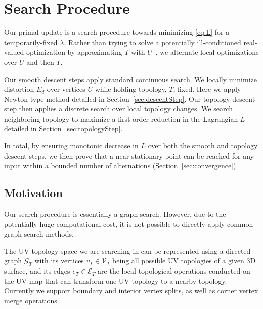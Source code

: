 
\section{Search Procedure}%
\label{sec:DCSearch}

Our primal update is a search procedure towards minimizing \eqref{eq:L} for a temporarily-fixed $\lambda$. 
Rather than trying to solve a potentially ill-conditioned real-valued optimization by approximating $T$ with $U$\ \cite{Poranne2017Autocuts}, we alternate local optimizations over $U$ and then $T$. %

Our smooth descent steps apply standard continuous search. We locally minimize distortion $E_d$ over vertices $U$ while holding topology, $T$, fixed. Here we apply Newton-type method detailed in Section~\ref{sec:descentStep}.
%
Our topology descent step then applies a discrete search over local topology changes. We search neighboring topology to maximize a first-order reduction in the Lagrangian $L$ detailed in Section~\ref{sec:topologyStep}. 

In total, by ensuring monotonic decrease in $L$ over both the smooth and topology descent steps, we then prove that a near-stationary point can be reached for any input within a bounded number of alternations (Section~\ref{sec:convergence}).  

\subsection{Motivation}

Our search procedure is essentially a graph search. However, due to the potentially huge computational cost, it is not possible to directly apply common graph search methods.

The UV topology space we are searching in can be represented using a directed graph $\mathcal{G}_T$ with its vertices $v_T \in \mathcal{V}_T$ being all possible UV topologies of a given 3D surface, and its edges $e_T \in \mathcal{E}_T$ are the local topological operations conducted on the UV map that can transform one UV topology to a nearby topology. Currently we support boundary and interior vertex splits, as well as corner vertex merge operations.  

